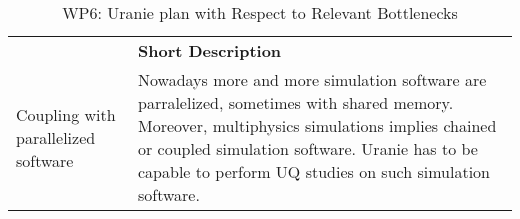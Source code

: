 \begin{table}[h!]
    \centering
    
    

    \centering
    { 
        \setlength{\parindent}{0pt}
        \def\arraystretch{1.25}
        {
            \fontsize{9}{11}\selectfont
            \begin{tabular}{!{\color{numpexgray}\vrule}p{.25\linewidth}!{\color{numpexgray}\vrule}p{.6885\linewidth}!{\color{numpexgray}\vrule}}
    
     &  {\rule{0pt}{2.5ex}\color{white}\bf Short Description }\\ 
    
 Coupling with parallelized software  & Nowadays more and more simulation software are parralelized, sometimes with shared memory. Moreover, multiphysics simulations implies chained or coupled simulation software. Uranie has to be capable to perform UQ studies on such simulation software. \\
\end{tabular}
        }
    }
    \caption{WP6: Uranie plan with Respect to Relevant Bottlenecks}
    \label{tab:WP6:Uranie:bottlenecks}
\end{table}